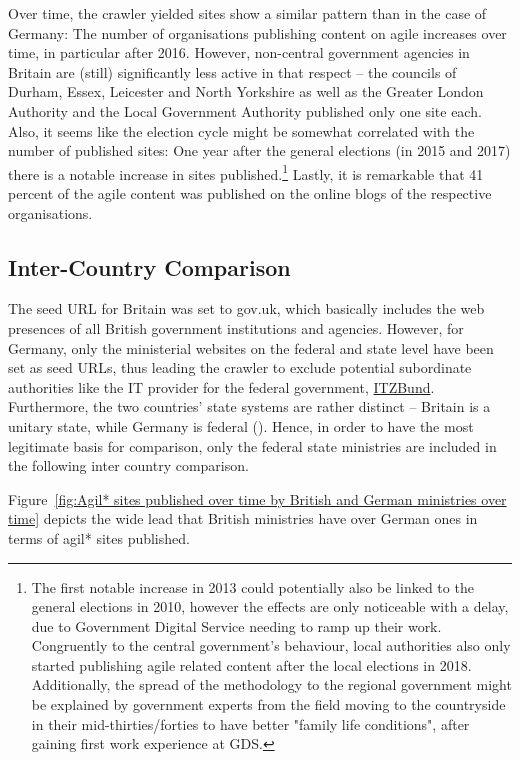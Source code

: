 Over time, the crawler yielded sites show a similar pattern than in the case of Germany: The number of organisations publishing content on agile increases over time, in particular after 2016. However, non-central government agencies in Britain are (still) significantly less active in that respect – the councils of Durham, Essex, Leicester and North Yorkshire as well as the Greater London Authority and the Local Government Authority published only one site each. Also, it seems like the election cycle might be somewhat correlated with the number of published sites: One year after the general elections (in 2015 and 2017) there is a notable increase in sites published.\footnote{The first notable increase in 2013 could potentially also be linked to the general elections in 2010, however the effects are only noticeable with a delay, due to Government Digital Service needing to ramp up their work. Congruently to the central government's behaviour, local authorities also only started publishing agile related content after the local elections in 2018. Additionally, the spread of the methodology to the regional government might be explained by government experts from the field moving to the countryside in their mid-thirties/forties to have better "family life conditions", after gaining first work experience at GDS.} Lastly, it is remarkable that 41 percent of the agile content was published on the online blogs of the respective organisations.

\subsection{Inter-Country Comparison} 
The seed URL for Britain was set to gov.uk, which basically includes the web presences of all British government institutions and agencies. However, for Germany, only the ministerial websites on the federal and state level have been set as seed URLs, thus leading the crawler to exclude potential subordinate authorities like the IT provider for the federal government, \href{https://www.itzbund.de/DE/Home/home_node.html}{ITZBund}. Furthermore, the two countries' state systems are rather distinct – Britain is a unitary state, while Germany is federal (\cite{Elazar1997}). Hence, in order to have the most legitimate basis for comparison, only the federal state ministries are included in the following inter country comparison. 

\begin{wrapfigure}[10]{r}{0.5\textwidth}
	\centering
	 \texttt{[image: \{"Analysis/3\_Data\_Analysis/visualisations/british\_vs\_German\_federal\_ministries\_over\_time"]}.pdf}
	 \caption[Agil* sites published by British and German ministries over time]{Agil* sites published by British and German ministries over time}
	 \setlength{\belowcaptionskip}{-30pt}
	 \label{fig:Agil* sites published over time by British and German ministries over time}
\end{wrapfigure}
Figure~\ref{fig:Agil* sites published over time by British and German ministries over time} depicts the wide lead that British ministries have over German ones in terms of agil* sites published. 

